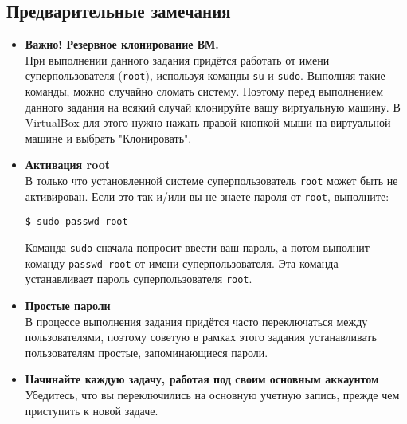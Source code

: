 \documentclass{article}
\begin{document}
\subsection*{Предварительные замечания}
\begin{itemize}
\item \textbf{Важно! Резервное клонирование ВМ.} \\
При выполнении данного задания придётся работать от имени суперпользователя (\texttt{root}), используя команды \texttt{su} и \texttt{sudo}. Выполняя такие команды, можно случайно сломать систему. Поэтому перед выполнением данного задания на всякий случай клонируйте вашу виртуальную машину. В VirtualBox для этого нужно нажать правой кнопкой мыши на виртуальной машине и выбрать "Клонировать".


\item \textbf{Активация root} \\
В только что установленной системе суперпользователь \texttt{root} может быть не активирован. Если это так и/или вы не знаете пароля от \texttt{root}, выполните:
\begin{lstlisting}
$ sudo passwd root
\end{lstlisting}
Команда \texttt{sudo} сначала попросит ввести ваш пароль, а потом выполнит команду \texttt{passwd root} от имени суперпользователя. Эта команда устанавливает пароль суперпользователя \texttt{root}.

\item \textbf{Простые пароли} \\
В процессе выполнения задания придётся часто переключаться между пользователями, поэтому советую в рамках этого задания устанавливать пользователям простые, запоминающиеся пароли.

\item \textbf{Начинайте каждую задачу, работая под своим основным аккаунтом} \\
Убедитесь, что вы переключились на основную учетную запись, прежде чем приступить к новой задаче.

\iffalse
\item \textbf{Создание нового пользователя} \\
Для проверки работы команд нам понадобится ещё один пользователь, помимо вашего основного пользователя и суперпользователя \texttt{root}. Создайте нового пользователя \texttt{alice}, используя следующие команды:
\begin{lstlisting}
sudo adduser -m alice
sudo passwd alice
\end{lstlisting}
\fi
\end{itemize}
\end{document}
